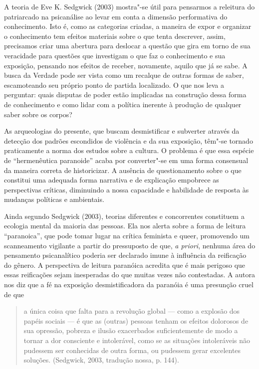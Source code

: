 A teoria de Eve K. Sedgwick (2003) mostra"-se útil para pensarmos a
releitura do patriarcado na psicanálise ao levar em conta a dimensão
performativa do conhecimento. Isto é, como as categorias criadas, a
maneira de expor e organizar o conhecimento tem efeitos materiais sobre
o que tenta descrever, assim, precisamos criar uma abertura para
deslocar a questão que gira em torno de sua veracidade para questões que
investigam o que faz o conhecimento e sua exposição, pensando nos
efeitos de receber, novamente, aquilo que já se sabe. A busca da Verdade
pode ser vista como um recalque de outras formas de saber, escamoteando
seu próprio ponto de partida localizado. O que nos leva a perguntar:
quais disputas de poder estão implicadas na construção dessa forma de
conhecimento e como lidar com a política inerente à produção de qualquer
saber sobre os corpos?

As arqueologias do presente, que buscam desmistificar e subverter
através da detecção dos padrões escondidos de violência e da sua
exposição, têm"-se tornado praticamente a norma dos estudos sobre a
cultura. O problema é que essa espécie de ``hermenêutica paranoide''
acaba por converter"-se em uma forma consensual da maneira correta de
historicizar. A ausência de questionamento sobre o que constitui uma
adequada forma narrativa e de explicação empobrece as perspectivas
críticas, diminuindo a nossa capacidade e habilidade de resposta às
mudanças políticas e ambientais.

Ainda segundo Sedgwick (2003), teorias diferentes e concorrentes
constituem a ecologia mental da maioria das pessoas. Ela nos alerta
sobre a forma de leitura ``paranoica'', que pode tomar lugar na crítica
feminista e queer, promovendo um scanneamento vigilante a partir do
pressuposto de que, \emph{a priori}, nenhuma área do pensamento
psicanalítico poderia ser declarado imune à influência da reificação do
gênero. A perspectiva de leitura paranóica acredita que é mais perigoso
que essas reificações sejam inesperadas do que muitas vezes não
contestadas. A autora nos diz que a fé na exposição desmistificadora da
paranóia é uma presunção cruel de que

\begin{quote}
a única coisa que falta para a revolução global --- como a explosão dos
papéis sociais --- é que as (outras) pessoas tenham os efeitos dolorosos
de sua opressão, pobreza e ilusão exacerbados suficientemente de modo a
tornar a dor consciente e intolerável, como se as situações intoleráveis
não pudessem ser conhecidas de outra forma, ou pudessem gerar excelentes
soluções. (Sedgwick, 2003, tradução nossa, p. 144).
\end{quote}

